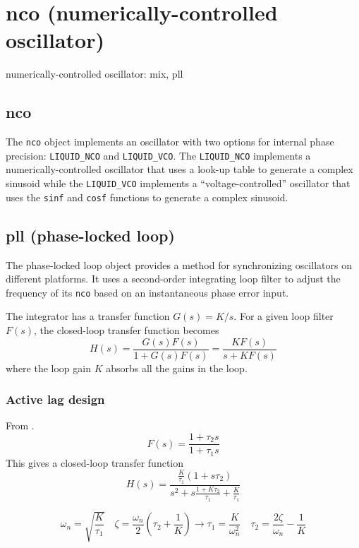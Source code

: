 % 
%

\section{nco (numerically-controlled oscillator)}
\label{module:nco}
numerically-controlled oscillator: mix, pll

\subsection{{nco}}
\label{module:nco:nco}
The {\tt nco} object implements an oscillator with two options for internal
phase precision: {\tt LIQUID\_NCO} and {\tt LIQUID\_VCO}.
The {\tt LIQUID\_NCO} implements a numerically-controlled oscillator that uses
a look-up table to generate a complex sinusoid while
the {\tt LIQUID\_VCO} implements a ``voltage-controlled'' oscillator that uses
the {\tt sinf} and {\tt cosf} functions to generate a complex sinusoid.

\subsection{{pll} (phase-locked loop)}
\label{module:nco:pll}
The phase-locked loop object provides a method for synchronizing oscillators
on different platforms.
It uses a second-order integrating loop filter to adjust the frequency of its
{\tt nco} based on an instantaneous phase error input.

The integrator has a transfer function $G(s) = K/s$.
For a given loop filter $F(s)$, the closed-loop transfer function becomes
\[
    H(s) = \frac{ G(s)F(s) }{ 1 + G(s)F(s) }
         = \frac{ KF(s)    }{ s + KF(s)    }
\]
where the loop gain $K$ absorbs all the gains in the loop.

\subsubsection{Active lag design}
From \cite{Best:1997}.
\[
    F(s) = \frac{1 + \tau_2 s}{1 + \tau_1 s}
\]
This gives a closed-loop transfer function
\[
    H(s) = \frac{
                \frac{K}{\tau_1} (1 + s\tau_2)
           } {
                s^2 + s\frac{1 + K\tau_2}{\tau_1} + \frac{K}{\tau_1}
           }
\]

\[
    \omega_n = \sqrt{\frac{K}{\tau_1}}
    \,\,\,\,\,\,
    \zeta = \frac{\omega_n}{2}\left(\tau_2 + \frac{1}{K}\right)
        \rightarrow
    \tau_1 = \frac{K}{\omega_n^2}
    \,\,\,\,\,\,
    \tau_2 = \frac{2\zeta}{\omega_n} - \frac{1}{K}
\]

